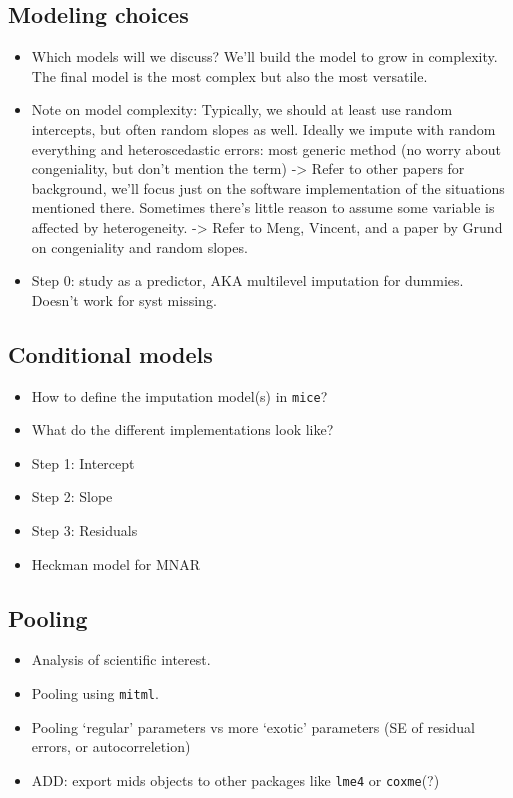 \documentclass[
]{jss}
\begin{document}
\hypertarget{modeling-choices}{%
\subsection{Modeling choices}\label{modeling-choices}}

\begin{itemize}
\item
  Which models will we discuss? We'll build the model to grow in
  complexity. The final model is the most complex but also the most
  versatile.
\item
  Note on model complexity: Typically, we should at least use random
  intercepts, but often random slopes as well. Ideally we impute with
  random everything and heteroscedastic errors: most generic method (no
  worry about congeniality, but don't mention the term) -\textgreater{}
  Refer to other papers for background, we'll focus just on the software
  implementation of the situations mentioned there. Sometimes there's
  little reason to assume some variable is affected by heterogeneity.
  -\textgreater{} Refer to Meng, Vincent, and a paper by Grund on
  congeniality and random slopes.
\item
  Step 0: study as a predictor, AKA multilevel imputation for dummies.
  Doesn't work for syst missing.
\end{itemize}

\hypertarget{conditional-models}{%
\subsection{Conditional models}\label{conditional-models}}

\begin{itemize}
\item
  How to define the imputation model(s) in \texttt{mice}?
\item
  What do the different implementations look like?
\item
  Step 1: Intercept
\item
  Step 2: Slope
\item
  Step 3: Residuals
\item
  Heckman model for MNAR
\end{itemize}

\hypertarget{pooling}{%
\subsection{Pooling}\label{pooling}}

\begin{itemize}
\item
  Analysis of scientific interest.
\item
  Pooling using \texttt{mitml}.
\item
  Pooling `regular' parameters vs more `exotic' parameters (SE of
  residual errors, or autocorreletion)
\item
  ADD: export mids objects to other packages like \texttt{lme4} or
  \texttt{coxme}(?)
\end{itemize}
\end{document}
